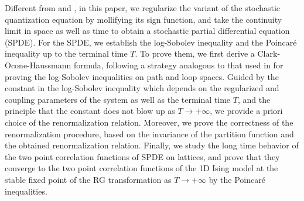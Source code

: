 \documentclass[11pt]{article}
\numberwithin{equation}{section}%
\numberwithin{figure}{section}%
\theoremstyle{remark}
\begin{document}
	Different from \cite{Cui2022document} and \cite{Cui2024document}, in this paper, we regularize the variant of the stochastic quantization equation by mollifying its sign function, and take the continuity limit in space as well as time to obtain a stochastic partial differential equation (SPDE). For the SPDE, we establish the log-Sobolev inequality and the Poincar\'e inequality up to the terminal time $T$. To prove them, we first derive a Clark-Ocone-Haussmann formula, following a strategy analogous to that used in \cite{Capitaine1997document, Fang1999document, Gong1998document} for proving the log-Sobolev inequalities on path and loop spaces. Guided by the constant in the log-Sobolev inequality which depends on the regularized and coupling parameters of the system as well as the terminal time $T$, and the principle that the constant does not blow up as $T\rightarrow+\infty$, we provide a priori choice of the renormalization relation. Moreover, we prove the correctness of the renormalization procedure, based on the invariance of the partition function and the obtained renormalization relation. Finally, we study the long time behavior of the two point
	correlation functions of SPDE on lattices, and prove that they converge to the two point correlation functions of the 1D Ising model at the stable fixed point of the RG transformation as $T\rightarrow +\infty$ by the Poincar\'e inequalities.
	
	
\end{document}
